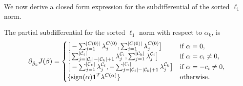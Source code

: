 We now derive a closed form expression for the subdifferential
of the sorted \(\ell_1\) norm.
\begin{theorem}
  \label{thm:cluster-subdifferential}
  The partial subdifferential for the sorted \(\ell_1\) norm with respect
  to \(\alpha_k\), is
  \[
    \partial_{\tilde \beta_k}  J(\beta)       =
    \begin{cases}
      \big[-\sum_{j=1}^{|C(0)|}\lambda^{C(0)}_j, \sum_{j=1}^{|C(0)|}\lambda^{C(0)}_j\big]                                                                        & \text{if } \alpha = 0,           \\
      \big[\sum_{j=|\mathcal{C}_i| - |\mathcal{C}_k|+1}^{|\mathcal{C}_i|}\lambda^{\mathcal{C}_i}_j, \sum_{j=1}^{|\mathcal{C}_k|}\lambda^{\mathcal{C}_i}_j\big]   & \text{if } \alpha = c_i \neq 0,  \\
      \big[-\sum_{j=1}^{|\mathcal{C}_k|}\lambda^{\mathcal{C}_i}_j, -\sum_{j=|\mathcal{C}_i| - |\mathcal{C}_k|+1}^{|\mathcal{C}_i|}\lambda^{\mathcal{C}_k}_j\big] & \text{if } \alpha = -c_i \neq 0, \\
      \{\operatorname{sign}(\alpha)\boldsymbol{1}^T\lambda^{C(\alpha)}\}                                                                                                       & \text{otherwise.
      }
    \end{cases}
  \]
\end{theorem}
